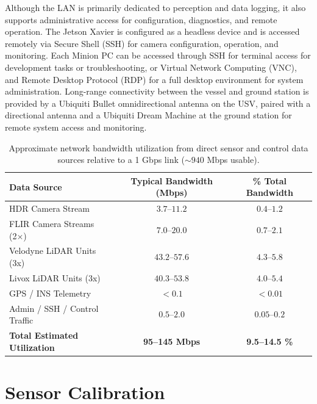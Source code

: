 \documentclass{erauthesis}
\begin{document}
Although the LAN is primarily dedicated to perception and data logging, it also supports administrative access for configuration, diagnostics, and remote operation.
The Jetson Xavier is configured as a headless device and is accessed remotely via Secure Shell (SSH) for camera configuration, operation, and monitoring.
Each Minion PC can be accessed through SSH for terminal access for development tasks or troubleshooting, or Virtual Network Computing (VNC), and Remote Desktop Protocol (RDP) for a full desktop environment for system administration.
Long-range connectivity between the vessel and ground station is provided by a Ubiquiti Bullet omnidirectional antenna on the \ac{USV}, paired with a directional antenna and a Ubiquiti Dream Machine at the ground station for remote system access and monitoring.

\begin{table}[htbp]
\centering
\begin{tabular}{lcc}
\hline
Data Source & Typical Bandwidth (Mbps) & \% Total Bandwidth \\
\hline
\hline
HDR Camera Stream & $3.7$--$11.2$ & $0.4$--$1.2$ \\
FLIR Camera Streams (2×) & $7.0$--$20.0$ & $0.7$--$2.1$ \\
Velodyne LiDAR Units (3x) & $43.2$--$57.6$ & $4.3$--$5.8$ \\
Livox LiDAR Units (3x) & $40.3$--$53.8$ & $4.0$--$5.4$ \\
GPS / INS Telemetry & $<0.1$ & $<0.01$ \\
Admin / SSH / Control Traffic & $0.5$--$2.0$ & $0.05$--$0.2$ \\
\hline
\textbf{Total Estimated Utilization} & \textbf{95--145 Mbps} & \textbf{9.5--14.5 \%} \\
\end{tabular}
\caption{Approximate network bandwidth utilization from direct sensor and control data sources relative to a 1 Gbps link ($\sim940$ Mbps usable).}
\label{table:network_bandwidth}
\end{table}


\section{Sensor Calibration} \label{sec:calibration}
\end{document}
